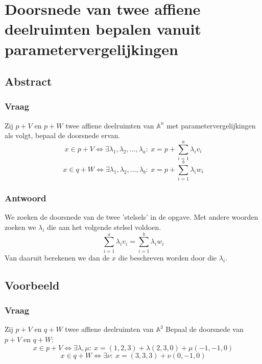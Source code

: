 \documentclass[main.tex]{subfiles}
\begin{document}
\newpage
\section{Doorsnede van twee affiene deelruimten bepalen vanuit parametervergelijkingen}
\label{sec:doorsnede-van-affiene-deelruimten-bepalen}
\subsection*{Abstract}
\subsubsection*{Vraag}
\begin{center}
  Zij $p+V$ en $p+W$ twee affiene deelruimten van $\mathbb{A}^{n}$ met parametervergelijkingen als volgt, bepaal de doorsnede ervan.
  \[ x\in p+V \Leftrightarrow \exists \lambda_{1},\lambda_{2},\dotsc,\lambda_{a}:\ x = p + \sum_{i=1}^{a}\lambda_{i}v_{i} \]
  \[ x\in q+W \Leftrightarrow \exists \lambda_{1},\lambda_{2},\dotsc,\lambda_{b}:\ x = p + \sum_{i=1}^{b}\lambda_{i}w_{i} \]
\end{center}

\subsubsection*{Antwoord}
We zoeken de doorsnede van de twee 'stelsels' in de opgave.
Met andere woorden zoeken we $\lambda_{i}$ die aan het volgende stelsel voldoen.
\[ \sum_{i=1}^{a}\lambda_{i}v_{i} = \sum_{i=1}^{b}\lambda_{i}w_{i} \]
Van daaruit berekenen we dan de $x$ die beschreven worden door die $\lambda_{i}$.

\subsection*{Voorbeeld}
\subsubsection*{Vraag}
\begin{center}
  Zij $p+V$ en $q+W$ twee affiene deelruimten van $\mathbb{A}^{3}$ 
  Bepaal de doorsnede van $p+V$ en $q+W$:
  \[ x\in p+V \Leftrightarrow \exists \lambda, \mu:\ x = (1,2,3) + \lambda (2,3,0) + \mu (-1,-1,0) \]
  \[ x\in q+W \Leftrightarrow \exists \nu:\ x = (3,3,3) + \nu (0,-1,0) \]
\end{center}
\end{document}
